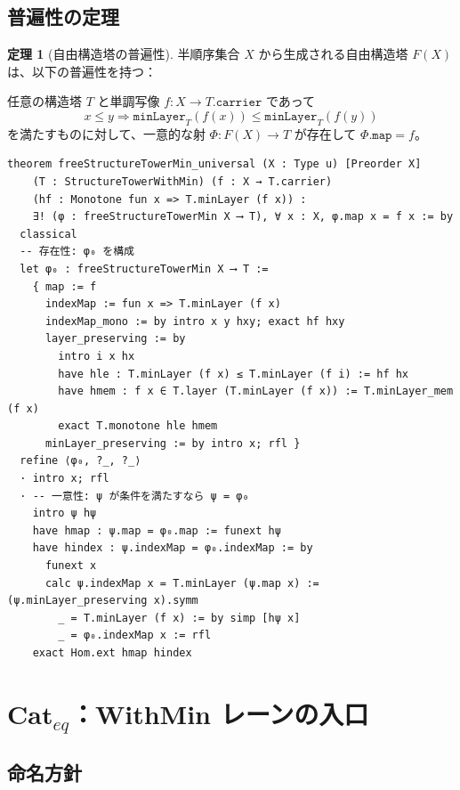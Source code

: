 \documentclass{ltjsarticle}
\theoremstyle{definition}
\newtheorem{theorem}[definition]{定理}
\newcommand{\minLayer}{\mathtt{minLayer}}
\begin{document}
\subsection{普遍性の定理}

\begin{theorem}[自由構造塔の普遍性]
半順序集合 $X$ から生成される自由構造塔 $F(X)$ は、以下の普遍性を持つ：

任意の構造塔 $T$ と単調写像 $f : X \to T.\mathtt{carrier}$ であって
\[
  x \leq y \Rightarrow \minLayer_T(f(x)) \leq \minLayer_T(f(y))
\]
を満たすものに対して、一意的な射 $\Phi : F(X) \to T$ が存在して
$\Phi.\mathtt{map} = f$。
\end{theorem}

\begin{lstlisting}[caption=普遍性の Lean 証明（CAT2\_complete.lean より）]
theorem freeStructureTowerMin_universal (X : Type u) [Preorder X]
    (T : StructureTowerWithMin) (f : X → T.carrier)
    (hf : Monotone fun x => T.minLayer (f x)) :
    ∃! (φ : freeStructureTowerMin X ⟶ T), ∀ x : X, φ.map x = f x := by
  classical
  -- 存在性: φ₀ を構成
  let φ₀ : freeStructureTowerMin X ⟶ T :=
    { map := f
      indexMap := fun x => T.minLayer (f x)
      indexMap_mono := by intro x y hxy; exact hf hxy
      layer_preserving := by
        intro i x hx
        have hle : T.minLayer (f x) ≤ T.minLayer (f i) := hf hx
        have hmem : f x ∈ T.layer (T.minLayer (f x)) := T.minLayer_mem (f x)
        exact T.monotone hle hmem
      minLayer_preserving := by intro x; rfl }
  refine ⟨φ₀, ?_, ?_⟩
  · intro x; rfl
  · -- 一意性: ψ が条件を満たすなら ψ = φ₀
    intro ψ hψ
    have hmap : ψ.map = φ₀.map := funext hψ
    have hindex : ψ.indexMap = φ₀.indexMap := by
      funext x
      calc ψ.indexMap x = T.minLayer (ψ.map x) := (ψ.minLayer_preserving x).symm
        _ = T.minLayer (f x) := by simp [hψ x]
        _ = φ₀.indexMap x := rfl
    exact Hom.ext hmap hindex
\end{lstlisting}

\section{$\mathbf{Cat}_{eq}$：WithMin レーンの入口}

\subsection{命名方針}
\end{document}
